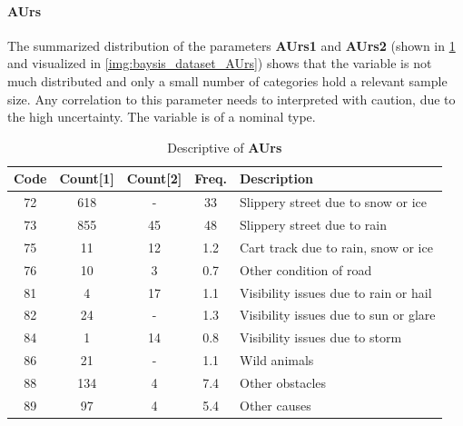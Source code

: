\paragraph{AUrs}
\label{baysis_dataset_AUrs}
The summarized distribution of the parameters \textbf{AUrs1} and \textbf{AUrs2} (shown in \cref{tbl:baysis_dataset_AUrs} and visualized in \cref{img:baysis_dataset_AUrs}) shows that the variable is not much distributed and only a small number of categories hold a relevant sample size. Any correlation to this parameter needs to interpreted with caution, due to the high uncertainty. The variable is of a nominal type.
\begin{table}[ht]
	\centering
	\small
	\begin{tabular}{c|c|c|c|l}
		\toprule
		Code & Count[1] & Count[2] & Freq. & Description \\ 
		\midrule
		72 & 618	& -		& 33  & Slippery street due to snow or ice \\
		73 & 855	& 45	& 48  & Slippery street due to rain \\
		75 & 11		& 12	& 1.2 & Cart track due to rain, snow or ice \\
		76 & 10		& 3		& 0.7 & Other condition of road \\
		81 & 4		& 17 	& 1.1 & Visibility issues due to rain or hail \\
		82 & 24		& -		& 1.3 & Visibility issues due to sun or glare \\
		84 & 1		& 14	& 0.8 & Visibility issues due to storm \\
		86 & 21		& -		& 1.1 & Wild animals \\
		88 & 134	& 4		& 7.4 & Other obstacles \\
		89 & 97		& 4		& 5.4 & Other causes \\
		\bottomrule
	\end{tabular}
	\caption{Descriptive of \textbf{AUrs}}
	\label{tbl:baysis_dataset_AUrs}
	\vspace{-8mm}
\end{table}
